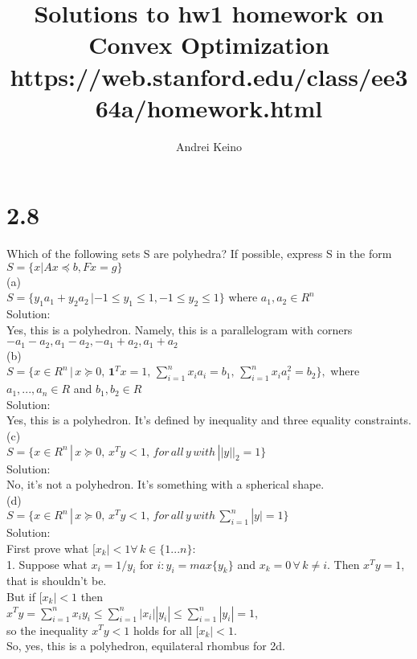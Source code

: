 \documentclass{article}
\begin{document}
\title{Solutions to hw1 homework on Convex Optimization https://web.stanford.edu/class/ee364a/homework.html}
\author{Andrei Keino}
\maketitle

\section*{2.8}

Which of the following sets S are polyhedra? If possible, express S in the form $S = \{x | Ax \preceq b , Fx = g\}$\\
(a)\\ $S = \{y_1 a_1 + y_2 a_2 \,| -1 \leq y_1 \leq 1 , -1 \leq y_2 \leq 1 \}$ where $a_1, a_2 \in R^n$\\
Solution:\\
Yes, this is a polyhedron. Namely, this is a parallelogram with corners ${-a_1 - a_2, a_1 - a_2, -a_1 + a_2, a_1 + a_2}$\\
(b)\\ $S = \{x \in R^n \, | \, x \succeq 0, \, \boldsymbol1^T x = 1, \, \sum_{i = 1}^{n}  x_i a_i = b_1, \, \sum_{i = 1}^{n}  x_i a_i^2 = b_2\},$ where ${a_1, ..., a_n \in R}$ and ${b_1, b_2 \in R} $\\
Solution:\\
Yes, this is a polyhedron. It's defined by inequality and three equality constraints. \\
(c) \\ 
$S = \{x \in R^n \, |\, x \succeq 0, \, x^T y < 1, \, for\, all \, y \, with \, ||y||_2 = 1 \}$\\
Solution:\\
No, it's not a polyhedron. It's something with a spherical shape.\\
(d)\\
$S = \{x \in R^n \, |\, x \succeq 0, \, x^T y < 1, \, for\, all \, y \, with \, \sum_{i=1}^{n} |y| = 1 \}$\\
Solution:\\
First prove what $[x_k| < 1 \forall \, k \in \{1...n\}$:\\
1. Suppose what $x_i = 1 / y_i$ for $i: y_i = max\{y_k\}$ and $x_k = 0 \, \forall \, k \neq i$. Then $ x^T y = 1$, that is shouldn't be.\\
But if $[x_k| < 1$ then\\
$x^T y = \sum_{i=1}^{n} x_i y_i \le \sum_{i=1}^{n} |x_i| |y_i| \le \sum_{i=1}^{n} |y_i| = 1$, \\so the inequality $x^T y < 1$ holds for all $[x_k| < 1$.
\\So, yes, this is a polyhedron, equilateral rhombus for 2d.
\end{document}

